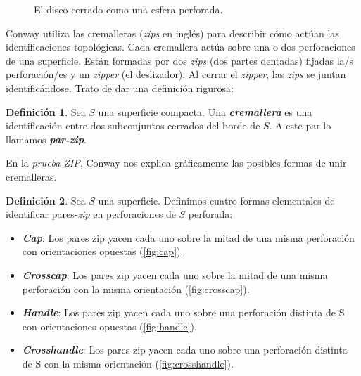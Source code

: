 \documentclass[10pt]{report}
\newcommand{\enfatiza}[1]{\textbf{\textit{#1}}}
\theoremstyle{definition}
\newtheorem{defin}{Definición}[section]
\begin{document}
\begin{figure}[h]%
\centering
{}
\caption{El disco cerrado como una esfera perforada.\label{fig:disco_esfera_perforada}}
\end{figure}


Conway utiliza las cremalleras (\textit{zips} en inglés) para describir cómo actúan las identificaciones topológicas. Cada cremallera actúa sobre una o dos perforaciones de una superficie. Están formadas por dos \textit{zips} (dos partes dentadas) fijadas la/s perforación/es y un \textit{zipper} (el deslizador). Al cerrar el \textit{zipper}, las \textit{zips} se juntan identificándose. Trato de dar una definición rigurosa:


\begin{defin}%
Sea $S$ una superficie compacta. Una \enfatiza{cremallera} es una identificación entre dos subconjuntos cerrados del borde de $S$. A este par lo llamamos \enfatiza{par-zip}.
\end{defin}


En la \textit{prueba ZIP}, Conway nos explica gráficamente las posibles formas de unir cremalleras. 

\begin{defin}
Sea $S$ una superficie. Definimos cuatro formas elementales de identificar pares-\textit{zip} en perforaciones de 
$S$ perforada:

\begin{itemize}
\item[1.] \enfatiza{Cap}: Los pares zip yacen cada uno sobre la mitad de una misma perforación con orientaciones opuestas (\autoref{fig:cap}).
\item[2.] \enfatiza{Crosscap}: Los pares zip yacen cada uno sobre la mitad de una misma perforación con la misma orientación (\autoref{fig:crosscap}).
\item[3.] \enfatiza{Handle}: Los pares zip yacen cada uno sobre una perforación distinta de S con orientaciones opuestas (\autoref{fig:handle}).
\item[4.] \enfatiza{Crosshandle}: Los pares zip yacen cada uno sobre una perforación distinta de S con la misma orientación (\autoref{fig:crosshandle}).
\end{itemize}
\end{defin}
\end{document}
